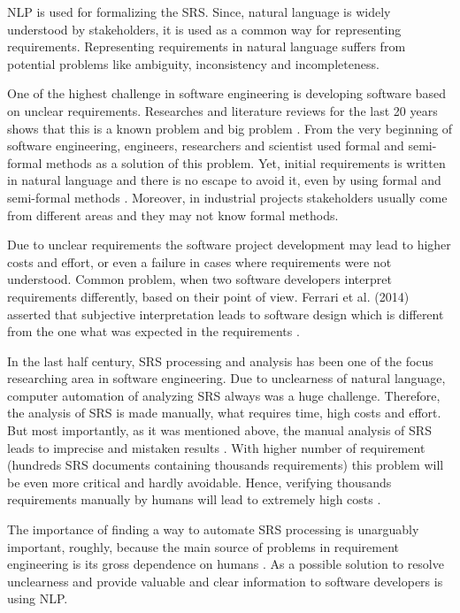 \begin{multicols}{2}	
	\gls{NLP} is used for formalizing the \gls{SRS}. Since, natural language is widely understood by stakeholders, it is used as a common way for representing requirements. Representing requirements in natural language suffers from potential problems like ambiguity, inconsistency and incompleteness.
	
	One of the highest challenge in software engineering is developing software based on unclear requirements. Researches and literature reviews for the last 20 years shows that this is a known problem and big problem \cite{Besrour}. From the very beginning of software engineering, engineers, researchers and scientist used formal and semi-formal methods as a solution of this problem. Yet, initial requirements is written in natural language and there is no escape to avoid it, even by using formal and semi-formal methods \cite{Kamsties}. Moreover, in industrial projects stakeholders usually come from different areas and they may not know formal methods.
	
	Due to unclear requirements the software project development may lead to higher costs and effort, or even a failure in cases where requirements were not understood.
	Common problem, when two software developers interpret requirements differently, based on their point of view. Ferrari et al. (2014) asserted that subjective interpretation leads to software design which is different from the one what was expected in the requirements \cite{Ferrari}.
	
	In the last half century, \gls{SRS} processing and analysis has been one of the focus researching area in software engineering. Due to unclearness of natural language, computer automation of analyzing \gls{SRS} always was a huge challenge. Therefore, the analysis of \gls{SRS} is made manually, what requires time, high costs and effort. But most importantly, as it was mentioned above, the manual analysis of \gls{SRS} leads to imprecise and mistaken results \cite{Wang}. With higher number of requirement (hundreds \gls{SRS} documents containing thousands requirements) this problem will be even more critical and hardly avoidable. Hence, verifying thousands requirements manually by humans will lead to extremely high costs \cite{Fanmuy}.
	
	The importance of finding a way to automate \gls{SRS} processing is unarguably important, roughly, because the main source of problems in requirement engineering is its gross dependence on humans \cite{Ahmed}. As a possible solution to resolve unclearness and provide valuable and clear information to software developers is using \gls{NLP}.
	

\end{multicols}
